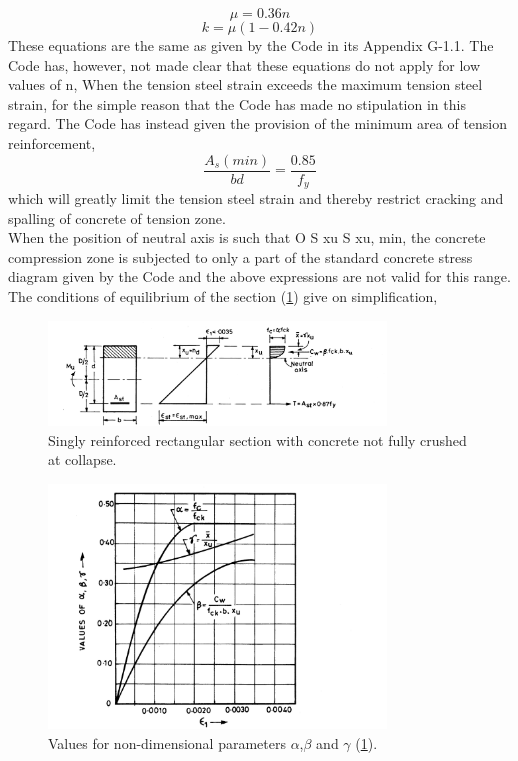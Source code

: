 \begin{equation}
\mu = 0.36n
\label{7}
\end{equation}
\begin{equation}
k=\mu(1-0.42n)
\label{8}
\end{equation}
These equations are the same as given by the Code in its Appendix G-1.1. The Code has,
however, not made clear that these equations do not apply for low values of n, When the tension
steel strain exceeds the maximum tension steel strain, for the simple reason that the Code
has made no stipulation in this regard. The Code has instead given the provision of the
minimum area of tension reinforcement,
\begin{equation*}
\frac{A_s(min)}{bd} = \frac{0.85}{f_y}
\label{9}
\end{equation*}
which will greatly limit the tension steel strain and thereby restrict cracking and spalling of
concrete of tension zone.\\
When the position of neutral axis is such that O S xu S xu, min, the concrete compression
zone is subjected to only a part of the standard concrete stress diagram given by the Code and
the above expressions are not valid for this range. The conditions of equilibrium of the section
(\fig \ref{Singly reinforced section}) give on simpliﬁcation,
\begin{figure}
\centering
\includegraphics[width=0.8\textwidth]{images/ch2-2.png}
\caption{Singly reinforced rectangular section with concrete not fully crushed at collapse.}
\label{Singly reinforced section}
\end{figure}
\begin{figure}
\centering
\includegraphics[width=0.8\textwidth]{images/ch2-3.png}
\caption{Values for non-dimensional parameters ${\alpha}$,${\beta}$ and ${\gamma}$ (\fig \ref{Singly reinforced section}).}
\label{Values for parameters}
\end{figure}
